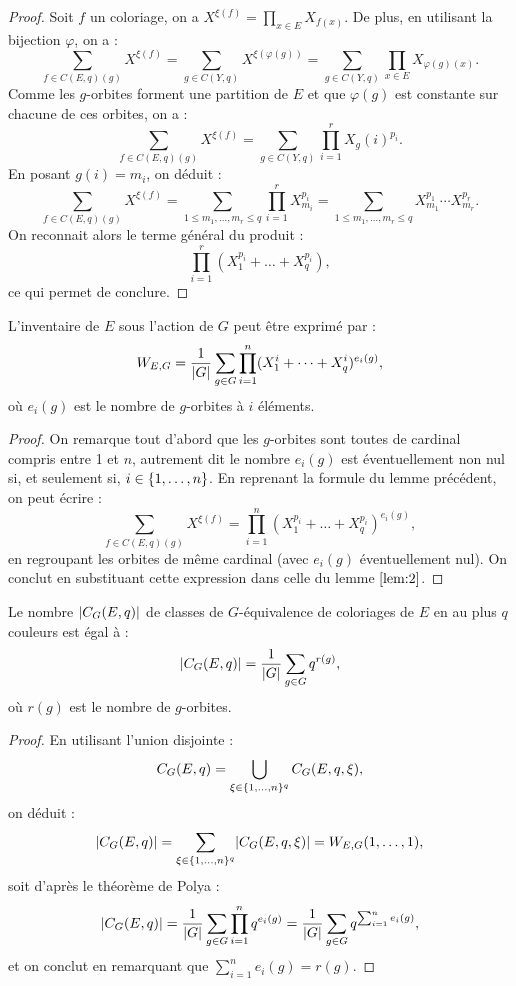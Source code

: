 \begin{proof}
Soit $f$ un coloriage, on a $X^{\xi(f)} = \prod_{x \in E} X_{f(x)}$. De plus, en utilisant la bijection $\varphi$, on a :
\[ \sum_{f \in C(E,q)(g)} X^{\xi(f)} = \sum_{g \in C(Y,q)} X^{\xi(\varphi(g))} = \sum_{g \in C(Y,q)} \prod_{x \in E} X_{\varphi(g)(x)} . \]
Comme les $g$-orbites forment une partition de $E$ et que $\varphi(g)$ est constante sur chacune de ces orbites, on a :
\[ \sum_{f \in C(E,q)(g)} X^{\xi(f)} = \sum_{g \in C(Y,q)} \prod_{i=1}^r X_g(i)^{p_i} . \]
En posant $g(i) = m_i$, on déduit :
\[ \sum_{f \in C(E,q)(g)} X^{\xi(f)} = \sum_{1 \leq m_1, \dots, m_r \leq q} \prod_{i=1}^r X_{m_i}^{p_i}
= \sum_{1 \leq m_1, \dots, m_r \leq q} X_{m_1}^{p_1} \cdots X_{m_r}^{p_r} . \] 
On reconnait alors le terme général du produit :
\[ \prod_{i=1}^r (X_1^{p_i} + \dots + X_q^{p_i}) , \]
ce qui permet de conclure.
\end{proof}

\begin{thm}[Polya]
L'inventaire de $E$ sous l'action de $G$ peut être exprimé par :
\[ W_{E,G} = \dfrac1{\lvert G\rvert} \sum_{g \in G} \prod_{i=1}^n (X_1^i + \dots + X_q^i)^{e_i(g)} , \]
où $e_i(g)$ est le nombre de $g$-orbites à $i$ éléments.
\end{thm}

\begin{proof}
On remarque tout d'abord que les $g$-orbites sont toutes de cardinal compris entre 1 et $n$, autrement dit le nombre $e_i(g)$
est éventuellement non nul si, et seulement si, $i \in \{ 1, \dots, n \}$.
En reprenant la formule du lemme précédent, on peut écrire :
\[ \sum_{f \in C(E,q)(g)} X^{\xi(f)} = \prod_{i=1}^n (X_1^{p_i}+\dots+X_q^{p_i})^{e_i(g)}, \]
en regroupant les orbites de même cardinal (avec $e_i(g)$ éventuellement nul).
On conclut en substituant cette expression dans celle du lemme $\ref{lem:2}$.
\end{proof}

\begin{coro}
Le nombre $\lvert C_G(E,q)\rvert$ de classes de $G$-équivalence de coloriages de $E$ en au plus $q$ couleurs est égal à :
\[ \lvert C_G(E,q)\rvert = \dfrac1{\lvert G\rvert} \sum_{g \in G} q^{r(g)} , \]
où $r(g)$ est le nombre de $g$-orbites.
\end{coro}

\begin{proof}
En utilisant l'union disjointe :
\[ C_G(E,q) = \bigcup_{\xi \in \{ 1, \dots, n \}^q} C_G(E,q, \xi) , \]
on déduit :
\[ \lvert C_G(E,q)\rvert = \sum_{\xi \in \{ 1, \dots, n \}^q} \lvert C_G(E,q, \xi)\rvert = W_{E,G}(1, \dots, 1) , \]
soit d'après le théorème de Polya :
\[ \lvert C_G(E,q)\rvert = \dfrac1{\lvert G\rvert} \sum_{g \in G} \prod_{i=1}^n q^{e_i(g)} = \dfrac1{\lvert G\rvert} \sum_{g \in G} q^{\sum_{i=1}^n e_i(g)} , \]
et on conclut en remarquant que $\sum_{i=1}^n e_i(g) = r(g)$.
\end{proof}

